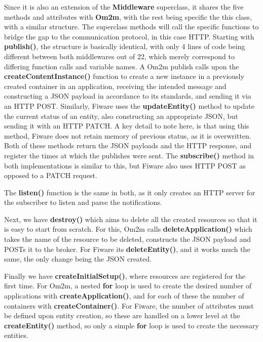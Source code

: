 \documentclass[conference]{IEEEtran}
\begin{document}
Since it is also an extension of the \textbf{Middleware} superclass, it shares the five methods and attributes with \textbf{Om2m}, with the rest being specific the this class, with a similar structure. The superclass methods will call the specific functions to bridge the gap to the communication protocol, in this case HTTP. Starting with \textbf{publish()}, the structure is basically identical, with only 4 lines of code being different between both middlewares out of 22, which merely correspond to differing function calls and variable names. A Om2m publish calls upon the \textbf{createContentInstance()} function to create a new instance in a previously created container in an application, receiving the intended message and constructing a JSON payload in accordance to its standards, and sending it via an HTTP POST. Similarly, Fiware uses the \textbf{updateEntity()} method to update the current status of an entity, also constructing an appropriate JSON, but sending it with an HTTP PATCH. A key detail to note here, is that using this method, Fiware does not retain memory of previous status, as it is overwritten. Both of these methods return the JSON payloads and the HTTP response, and register the times at which the publishes were sent. The \textbf{subscribe()} method in both implementations is similar to this, but Fiware also uses HTTP POST as opposed to a PATCH request.

The \textbf{listen()} function is the same in both, as it only creates an HTTP server for the subscriber to listen and parse the notifications.

Next, we have \textbf{destroy()} which aims to delete all the created resources so that it is easy to start from scratch. For this, Om2m calls \textbf{deleteApplication()} which takes the name of the resource to be deleted, constructs the JSON payload and POSTs it to the broker. For Fiware its \textbf{deleteEntity()}, and it works much the same, the only change being the JSON created.

Finally we have \textbf{createInitialSetup()}, where resources are registered for the first time. For Om2m, a nested \textbf{for} loop is used to create the desired number of applications with \textbf{createApplication()}, and for each of these the number of containers with \textbf{createContainer()}. For Fiware, the number of attributes must be defined upon entity creation, so these are handled on a lower level at the \textbf{createEntity()} method, so only a simple \textbf{for} loop is used to create the necessary entities.
\end{document}
